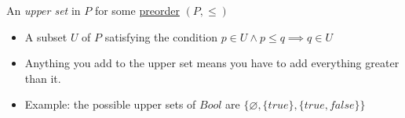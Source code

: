 
An \emph{upper set} in $P$ for some \href{doc/1 math/Seven Sketches in Compositionality/1 Chapter 1: Generative Effects/3 Preorders/Preorder}{preorder} $(P, \leq)$

\begin{itemize}
    \item A subset $U$ of $P$ satisfying the condition $p \in U \land p \leq q \implies q \in U$
    \item Anything you add to the upper set means you have to add everything greater than it.
    \item Example: the possible upper sets of $Bool$ are $\{\varnothing, \{true\}, \{true, false\}\}$
  \end{itemize}